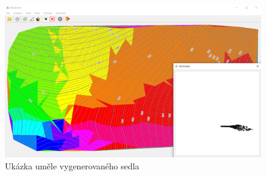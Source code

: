 \begin{figure}[H]
    \centering
    \includegraphics[width=\textwidth]{images/ukazka_sedlo.png}
    \caption{Ukázka uměle vygenerovaného sedla}
\end{figure}
